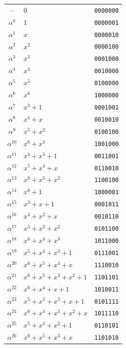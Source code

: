 \documentclass[10pt,a4paper]{article}
\begin{document}
\begin{longtable}{@{}c l c@{}}
    -- & $0$ & \texttt{0000000} \\
    $\alpha^{0}$ & $1$ & \texttt{0000001} \\
    $\alpha^{1}$ & $x$ & \texttt{0000010} \\
    $\alpha^{2}$ & $x^{2}$ & \texttt{0000100} \\
    $\alpha^{3}$ & $x^{3}$ & \texttt{0001000} \\
    $\alpha^{4}$ & $x^{4}$ & \texttt{0010000} \\
    $\alpha^{5}$ & $x^{5}$ & \texttt{0100000} \\
    $\alpha^{6}$ & $x^{6}$ & \texttt{1000000} \\
    $\alpha^{7}$ & $x^{3}+1$ & \texttt{0001001} \\
    $\alpha^{8}$ & $x^{4}+x$ & \texttt{0010010} \\
    $\alpha^{9}$ & $x^{5}+x^{2}$ & \texttt{0100100} \\
    $\alpha^{10}$ & $x^{6}+x^{3}$ & \texttt{1001000} \\
    $\alpha^{11}$ & $x^{4}+x^{3}+1$ & \texttt{0011001} \\
    $\alpha^{12}$ & $x^{5}+x^{4}+x$ & \texttt{0110010} \\
    $\alpha^{13}$ & $x^{6}+x^{5}+x^{2}$ & \texttt{1100100} \\
    $\alpha^{14}$ & $x^{6}+1$ & \texttt{1000001} \\
    $\alpha^{15}$ & $x^{3}+x+1$ & \texttt{0001011} \\
    $\alpha^{16}$ & $x^{4}+x^{2}+x$ & \texttt{0010110} \\
    $\alpha^{17}$ & $x^{5}+x^{3}+x^{2}$ & \texttt{0101100} \\
    $\alpha^{18}$ & $x^{6}+x^{4}+x^{3}$ & \texttt{1011000} \\
    $\alpha^{19}$ & $x^{5}+x^{4}+x^{3}+1$ & \texttt{0111001} \\
    $\alpha^{20}$ & $x^{6}+x^{5}+x^{4}+x$ & \texttt{1110010} \\
    $\alpha^{21}$ & $x^{6}+x^{5}+x^{3}+x^{2}+1$ & \texttt{1101101} \\
    $\alpha^{22}$ & $x^{6}+x^{4}+x+1$ & \texttt{1010011} \\
    $\alpha^{23}$ & $x^{5}+x^{3}+x^{2}+x+1$ & \texttt{0101111} \\
    $\alpha^{24}$ & $x^{6}+x^{4}+x^{3}+x^{2}+x$ & \texttt{1011110} \\
    $\alpha^{25}$ & $x^{5}+x^{4}+x^{2}+1$ & \texttt{0110101} \\
    $\alpha^{26}$ & $x^{6}+x^{5}+x^{3}+x$ & \texttt{1101010} \\

\end{longtable}
\end{document}
